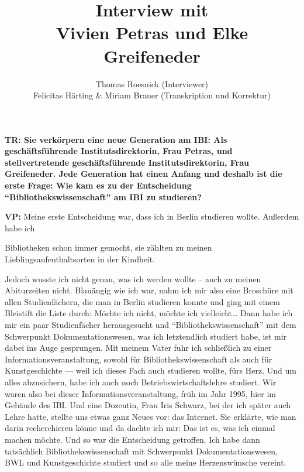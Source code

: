 \documentclass[a4paper,
fontsize=11pt,
oneside,
numbers=noperiodatend,
parskip=half-,
bibliography=totoc,
final
]{scrartcl}
\title{\LARGE{Interview mit \\ Vivien Petras und Elke Greifeneder}}%
\author{Thomas Roesnick (Interviewer) \\ Felicitas Härting \& Miriam Brauer (Transkription und Korrektur)} %
\date{}
\begin{document}
\maketitle
\thispagestyle{fancyplain} 


\textbf{TR: Sie verkörpern eine neue Generation am IBI: Als
geschäftsführende Institutsdirektorin, Frau Petras, und stellvertretende
geschäftsführende Institutsdirektorin, Frau Greifeneder. Jede Generation
hat einen Anfang und deshalb ist die erste Frage: Wie kam es zu der
Entscheidung \enquote{Bibliothekswissenschaft} am IBI zu studieren?}

\textbf{VP:} Meine erste Entscheidung war, dass ich in Berlin studieren
wollte. Außerdem habe ich

Bibliotheken schon immer gemocht, sie zählten zu meinen
Lieblingsaufenthaltsorten in der Kindheit.

Jedoch wusste ich nicht genau, was ich werden wollte -- auch zu meinen
Abiturzeiten nicht. Blauäugig wie ich war, nahm ich mir also eine
Broschüre mit allen Studienfächern, die man in Berlin studieren konnte
und ging mit einem Bleistift die Liste durch: Möchte ich nicht, möchte
ich vielleicht\ldots{} Dann habe ich mir ein paar Studienfächer
herausgesucht und \enquote{Bibliothekswissenschaft} mit dem Schwerpunkt
Dokumentationswesen, was ich letztendlich studiert habe, ist mir dabei
ins Auge gesprungen. Mit meinem Vater fuhr ich schließlich zu einer
Informationsveranstaltung, sowohl für Bibliothekswissenschaft als auch
für Kunstgeschichte --- weil ich dieses Fach auch studieren wollte, fürs
Herz. Und um alles abzusichern, habe ich auch noch
Betriebswirtschaftslehre studiert. Wir waren also bei dieser
Informationsveranstaltung, früh im Jahr 1995, hier im Gebäude des IBI.
Und eine Dozentin, Frau Iris Schwarz, bei der ich später auch Lehre
hatte, stellte uns etwas ganz Neues vor: das Internet. Sie erklärte, wie
man darin recherchieren könne und da dachte ich mir: Das ist es, was ich
einmal machen möchte. Und so war die Entscheidung getroffen. Ich habe
dann tatsächlich Bibliothekswissenschaft mit Schwerpunkt
Dokumentationswesen, BWL und Kunstgeschichte studiert und so alle meine
Herzenswünsche vereint.
\end{document}

